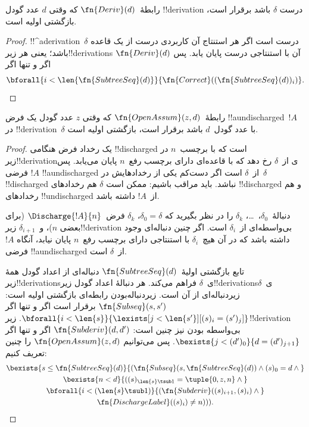 \documentclass[../../../include/open-logic-section]{subfiles}
\begin{document}
\begin{prop}
  رابطهٔ~$\fn{Deriv}(d)$ که وقتی $d$ عدد گودل !!{derivation} درست
  $\delta$ باشد برقرار است، بازگشتی اولیه است.
\end{prop}

\begin{proof}
  !!^a{derivation}~$\delta$ درست است اگر هر استنتاج آن کاربردی درست از یک
  قاعده باشد؛ یعنی هر زیر!!{derivation}s آن با استنتاجی درست پایان یابد.
  پس $\fn{Deriv}(d)$ اگر و تنها اگر
  \[
  \bforall{i<\len{\fn{SubtreeSeq}(d)}}{\fn{Correct}((\fn{SubtreeSeq}(d))_i)}.
  \]
\end{proof}

\begin{prop}
   رابطهٔ~$\fn{OpenAssum}(z,d)$ که وقتی $z$
  عدد گودل یک فرض !!a{undischarged}ٔ~$!A$ در !!{derivation}~$\delta$ با عدد
  گودل~$d$ باشد برقرار است، بازگشتی اولیه است.
\end{prop}

\begin{proof}
  یک رخداد فرض هنگامی !!{discharged} است که با برچسب~$n$ در
  زیر!!{derivation}ی از~$\delta$ رخ دهد که با قاعده‌ای دارای برچسب رفع~$n$
  پایان می‌یابد. پس $!A$ فرضی !!a{undischarged} از~$\delta$ است اگر دست‌کم
  یکی از رخدادهایش در~$\delta$ !!{discharged} نباشد. باید مراقب باشیم:
  ممکن است $\delta$ هم رخدادهای !!{discharged} و هم رخدادهای
  !!{undischarged} از~$!A$ داشته باشد.

  دنبالهٔ~$\delta_0$،~\dots، $\delta_k$ را در نظر بگیرید که
  $\delta_0=\delta$، $\delta_k$ فرض~$\Discharge{!A}{n}$ (برای بعضی
  $n$)، و~$\delta_{i+1}$ زیر!!{derivation} بی‌واسطه‌ای از~$\delta_i$ است.
  اگر چنین دنباله‌ای وجود داشته باشد که در آن هیچ~$\delta_i$ با
  استنتاجی دارای برچسب رفع~$n$ پایان نیابد، آنگاه $!A$ فرضی
  !!a{undischarged} از~$\delta$ است.

  تابع بازگشتی اولیهٔ~$\fn{SubtreeSeq}(d)$ دنباله‌ای از اعداد گودل
  همهٔ زیر!!{derivation}sی~$\delta$ فراهم می‌کند. هر دنبالهٔ اعداد گودل
  زیر!!{derivation}sی~$\delta$ زیر‌دنباله‌ای از آن است. زیر‌دنباله‌بودن
  رابطه‌ای بازگشتی اولیه است: $\fn{Subseq}(s,s')$ برقرار است اگر و
  تنها اگر
  $\bforall{i<\len{s}}{\lexists[j<\len{s'}][(s)_i=(s')_j]}$.
  زیر!!{derivation} بی‌واسطه بودن نیز چنین است:
  $\fn{Subderiv}(d,d')$ اگر و تنها اگر
  $\bexists{j<(d')_0}{d=(d')_{j+1}}$. پس می‌توانیم
  $\fn{OpenAssum}(z,d)$ را چنین تعریف کنیم:
  \begin{multline*}
    \bexists{s\leq\fn{SubtreeSeq}(d)}{(\fn{Subseq}(s, \fn{SubtreeSeq}(d))
      \land (s)_0 = d \land {}} \\
    \bexists{n<d}{((s)_{\len{s} \tsub 1} = \tuple{0, z, n} \land {}}\\
      \bforall{i<(\len{s} \tsub 1)}{(\fn{Subderiv}((s)_{i+1}, (s)_i) \land {}}\\
      \fn{DischargeLabel}((s)_i) \neq n))).
  \end{multline*}
\end{proof}
\end{document}

